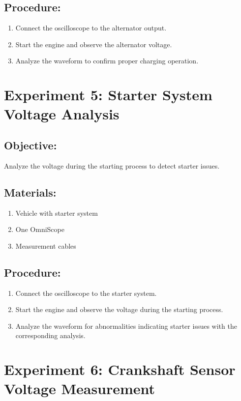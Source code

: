 \documentclass[]{scrreprt}
\begin{document}
    \subsection*{Procedure:}
    \begin{enumerate}
        \item Connect the oscilloscope to the alternator output.
        \item Start the engine and observe the alternator voltage.
        \item Analyze the waveform to confirm proper charging operation.
    \end{enumerate}

    \section*{Experiment 5: Starter System Voltage Analysis}
    \subsection*{Objective:} Analyze the voltage during the starting process to detect starter issues.
    \subsection*{Materials:}
    \begin{enumerate}
        \item Vehicle with starter system
        \item One OmniScope
        \item Measurement cables
    \end{enumerate}
    \subsection*{Procedure:}
    \begin{enumerate}
        \item Connect the oscilloscope to the starter system.
        \item Start the engine and observe the voltage during the starting process.
        \item Analyze the waveform for abnormalities indicating starter issues with the corresponding analysis.
    \end{enumerate}

    \section*{Experiment 6: Crankshaft Sensor Voltage Measurement}
\end{document}

